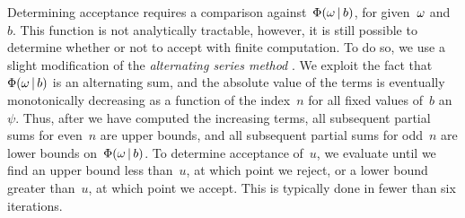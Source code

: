 Determining acceptance requires a comparison against~$\Phi({\omega}
\,|\, b)$, for given~${\omega}$ and~$b$. This function is not
analytically tractable, however, it is still possible to determine
whether or not to accept with finite computation. To do so, we use a
slight modification of the \emph{alternating series method}
\citep{devroye1986}.  We exploit the fact that ~$\Phi({\omega} \,|\, b)$
is an alternating sum, and the absolute value of the terms is
eventually monotonically decreasing as a function of the index~$n$ for
all fixed values of~$b$ an~$\psi$.  Thus, after we have computed the
increasing terms, all subsequent partial sums for even~$n$ are upper
bounds, and all subsequent partial sums for odd~$n$ are lower bounds
on~$\Phi({\omega}\,|\, b)$.  To determine acceptance of~$u$, we
evaluate until we find an upper bound less than~$u$, at which point we
reject, or a lower bound greater than~$u$, at which point we
accept. This is typically done in fewer than six iterations. 


